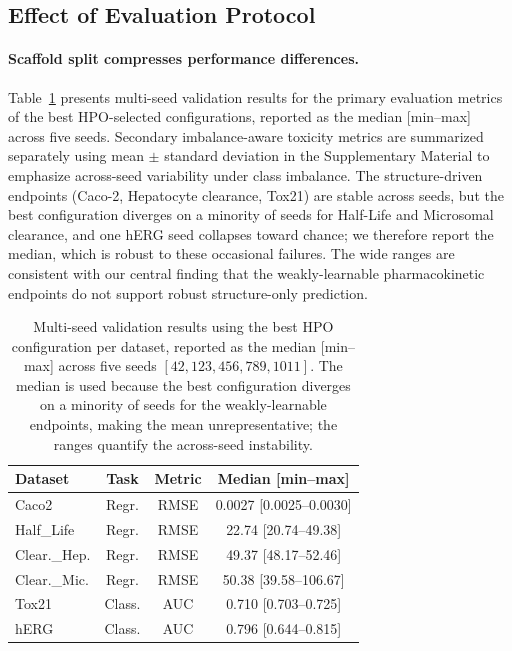 \documentclass[journal]{IEEEtran}
\begin{document}
\subsection{Effect of Evaluation Protocol}
\label{sec:eval_protocol}

\paragraph{Scaffold split compresses performance differences.}
Table~\ref{tab:multiseed} presents multi-seed validation results for the primary evaluation metrics of the best HPO-selected configurations, reported as the median [min--max] across five seeds. Secondary imbalance-aware toxicity metrics are summarized separately using mean $\pm$ standard deviation in the Supplementary Material to emphasize across-seed variability under class imbalance. The structure-driven endpoints (Caco-2, Hepatocyte clearance, Tox21) are stable across seeds, but the best configuration diverges on a minority of seeds for Half-Life and Microsomal clearance, and one hERG seed collapses toward chance; we therefore report the median, which is robust to these occasional failures. The wide ranges are consistent with our central finding that the weakly-learnable pharmacokinetic endpoints do not support robust structure-only prediction.

\begin{table}[!t]
\centering

\caption{Multi-seed validation results using the best HPO configuration per dataset, reported as the median [min--max] across five seeds $[42, 123, 456, 789, 1011]$. The median is used because the best configuration diverges on a minority of seeds for the weakly-learnable endpoints, making the mean unrepresentative; the ranges quantify the across-seed instability.}
\label{tab:multiseed}
\small
\begin{tabular}{lccc}
\textbf{Dataset} & \textbf{Task} & \textbf{Metric} & \textbf{Median [min--max]} \\
\midrule
Caco2 & Regr. & RMSE & 0.0027 [0.0025--0.0030] \\
Half\_Life & Regr. & RMSE & 22.74 [20.74--49.38] \\
Clear.\_Hep. & Regr. & RMSE & 49.37 [48.17--52.46] \\
Clear.\_Mic. & Regr. & RMSE & 50.38 [39.58--106.67] \\
Tox21 & Class. & AUC & 0.710 [0.703--0.725] \\
hERG & Class. & AUC & 0.796 [0.644--0.815] \\
\bottomrule
\end{tabular}
\end{table}
\end{document}
